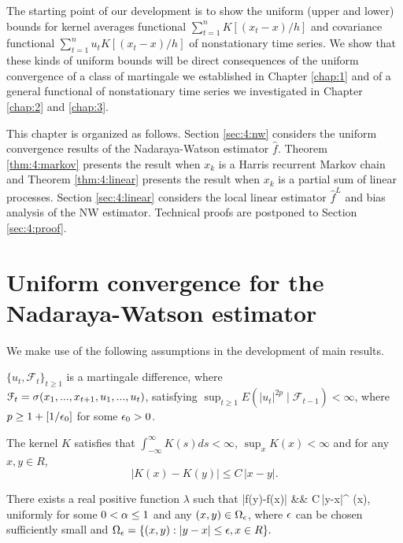 The starting point of our development is to show the uniform (upper and lower) bounds for kernel averages functional $\sum_{t=1}^{n}K[(x_{t}-x)/h]$ and covariance functional $\sum_{t=1}^{n}u_t K[(x_{t}-x)/h]$ of nonstationary time series. We show that these kinds of uniform bounds will be direct consequences of the uniform convergence of a class of martingale we established in Chapter \ref{chap:1} and of a general functional of nonstationary time series we investigated in Chapter \ref{chap:2} and \ref{chap:3}. 

This chapter is organized as follows. Section \ref{sec:4:nw} considers the uniform convergence results of  the Nadaraya-Watson estimator $\widehat{f}$. Theorem \ref{thm:4:markov} presents the result when $x_k$ is a Harris recurrent Markov chain and Theorem \ref{thm:4:linear} presents the result when $x_k$ is a partial sum of linear processes. Section \ref{sec:4:linear} considers the local linear estimator $\widehat{f}^L$ and bias analysis of the NW estimator. Technical proofs are postponed to Section \ref{sec:4:proof}.

\section{Uniform convergence for the Nadaraya-Watson estimator} 
We make use of the following assumptions in the development of main results.

\begin{assump} 
 $\{u_t, {\mathcal F}_t\}_{t\ge 1}$ is a martingale difference, where\\ ${\mathcal F}_t=\sigma (x_1, ..., x_{t+1}, u_1,...,u_t)$, satisfying $ \sup_{t\ge 1}E(|u_t|^{2p}\mid {\mathcal F}_{t-1})<\infty$, where  $p\ge 1+[1/\epsilon_0]$ for some $\epsilon_0>0$.
 \end{assump}

\begin{assump} 
The kernel $K$ satisfies that $\int_{-\infty}^{\infty}K(s)ds<\infty$, $\sup_xK(x)<\infty$
 and for any $x, y \in R$, $$ |K(x)-K(y)| \le C\, |x-y|. $$
\end{assump}

\begin{assump} 
There exists a real positive function $\lambda$ such that
\bestar
|f(y)-f(x)| &\leq& C\,|y-x|^{\alpha} \lambda(x),
\eestar
uniformly for some $0<\alpha\le 1$ and  any  $(x, y)\in \Omega_\epsilon$, where $\epsilon$ can be chosen sufficiently small and $ \Omega_{\epsilon} = \{(x,y): |y-x|\le \epsilon, x\in R\}. $
\end{assump}


